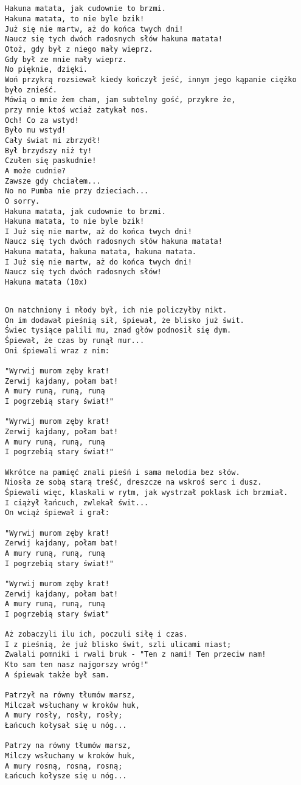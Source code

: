 \documentclass[12pt]{article}
\begin{document}
\subsection*{}
\begin{verbatim}
Hakuna matata, jak cudownie to brzmi.
Hakuna matata, to nie byle bzik!
Już się nie martw, aż do końca twych dni!
Naucz się tych dwóch radosnych słów hakuna matata!
Otoż, gdy był z niego mały wieprz.
Gdy był ze mnie mały wieprz.
No pięknie, dzięki.
Woń przykrą rozsiewał kiedy kończył jeść, innym jego kąpanie ciężko było znieść.
Mówią o mnie żem cham, jam subtelny gość, przykre że,
przy mnie ktoś wciaż zatykał nos.
Och! Co za wstyd!
Było mu wstyd!
Cały świat mi zbrzydł!
Był brzydszy niż ty!
Czułem się paskudnie!
A może cudnie?
Zawsze gdy chciałem...
No no Pumba nie przy dzieciach...
O sorry.
Hakuna matata, jak cudownie to brzmi.
Hakuna matata, to nie byle bzik!
I Już się nie martw, aż do końca twych dni!
Naucz się tych dwóch radosnych słów hakuna matata!
Hakuna matata, hakuna matata, hakuna matata.
I Już się nie martw, aż do końca twych dni!
Naucz się tych dwóch radosnych słów!
Hakuna matata (10x)
\end{verbatim}
\clearpage

\subsection*{}
\begin{verbatim}
On natchniony i młody był, ich nie policzyłby nikt.
On im dodawał pieśnią sił, śpiewał, że blisko już świt.
Świec tysiące palili mu, znad głów podnosił się dym.
Śpiewał, że czas by runął mur...
Oni śpiewali wraz z nim:

"Wyrwij murom zęby krat!
Zerwij kajdany, połam bat!
A mury runą, runą, runą
I pogrzebią stary świat!"

"Wyrwij murom zęby krat!
Zerwij kajdany, połam bat!
A mury runą, runą, runą
I pogrzebią stary świat!"

Wkrótce na pamięć znali pieśń i sama melodia bez słów.
Niosła ze sobą starą treść, dreszcze na wskroś serc i dusz.
Śpiewali więc, klaskali w rytm, jak wystrzał poklask ich brzmiał.
I ciążył łańcuch, zwlekał świt...
On wciąż śpiewał i grał:

"Wyrwij murom zęby krat!
Zerwij kajdany, połam bat!
A mury runą, runą, runą
I pogrzebią stary świat!"

"Wyrwij murom zęby krat!
Zerwij kajdany, połam bat!
A mury runą, runą, runą
I pogrzebią stary świat"

Aż zobaczyli ilu ich, poczuli siłę i czas.
I z pieśnią, że już blisko świt, szli ulicami miast;
Zwalali pomniki i rwali bruk - "Ten z nami! Ten przeciw nam!
Kto sam ten nasz najgorszy wróg!"
A śpiewak także był sam.

Patrzył na równy tłumów marsz,
Milczał wsłuchany w kroków huk,
A mury rosły, rosły, rosły;
Łańcuch kołysał się u nóg...

Patrzy na równy tłumów marsz,
Milczy wsłuchany w kroków huk,
A mury rosną, rosną, rosną;
Łańcuch kołysze się u nóg...
\end{verbatim}
\clearpage
\end{document}

